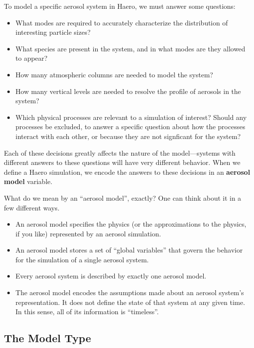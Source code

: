 To model a specific aerosol system in Haero, we must answer some questions:

\begin{itemize}
  \item What modes are required to accurately characterize the distribution of
        interesting particle sizes?
  \item What species are present in the system, and in what modes are they
        allowed to appear?
  \item How many atmospheric columns are needed to model the system?
  \item How many vertical levels are needed to resolve the profile of aerosols
        in the system?
  \item Which physical processes are relevant to a simulation of interest?
        Should any processes be excluded, to answer a specific question about
        how the processes interact with each other, or because they are not
        signficant for the system?
\end{itemize}

Each of these decisions greatly affects the nature of the model---systems with
different answers to these questions will have very different behavior. When we
define a Haero simulation, we encode the answers to these decisions in an
{\bf aerosol model} variable.

What do we mean by an ``aerosol model'', exactly? One can think about it in a
few different ways.

\begin{itemize}
  \item An aerosol model specifies the physics (or the approximations to the
        physics, if you like) represented by an aerosol simulation.
  \item An aerosol model stores a set of ``global variables'' that govern the
        behavior for the simulation of a single aerosol system.
  \item Every aerosol system is described by exactly one aerosol model.
  \item The aerosol model encodes the assumptions made about an aerosol system's
        representation. It does not define the state of that system at any given
        time. In this sense, all of its information is ``timeless''.
\end{itemize}

\subsection{The Model Type}

